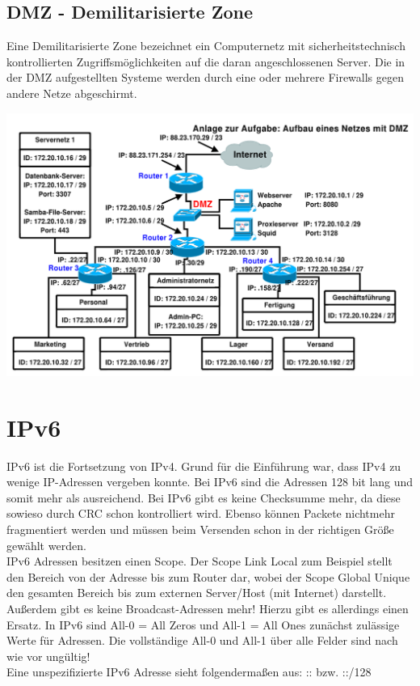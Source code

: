 \documentclass[12pt,a4paper]{article}
\begin{document}
		\subsection{DMZ - Demilitarisierte Zone}
			Eine Demilitarisierte Zone bezeichnet ein Computernetz mit sicherheitstechnisch kontrollierten Zugriffsmöglichkeiten auf die daran angeschlossenen Server. Die in der DMZ aufgestellten Systeme werden durch eine oder mehrere Firewalls gegen andere Netze abgeschirmt.
			\begin{center}
				\includegraphics[scale=0.9]{Bilder/DMZ.PNG}
			\end{center}
	
	\section{IPv6}
		IPv6 ist die Fortsetzung von IPv4. Grund für die Einführung war, dass IPv4 zu wenige IP-Adressen vergeben konnte. Bei IPv6 sind die Adressen 128 bit lang und somit mehr als ausreichend. Bei IPv6 gibt es keine Checksumme mehr, da diese sowieso durch CRC schon kontrolliert wird. Ebenso können Packete nichtmehr fragmentiert werden und müssen beim Versenden schon in der richtigen Größe gewählt werden. \\
		IPv6 Adressen besitzen einen Scope. Der Scope Link Local zum Beispiel stellt den Bereich von der Adresse bis zum Router dar, wobei der Scope Global Unique den gesamten Bereich bis zum externen Server/Host (mit Internet) darstellt. Außerdem gibt es keine Broadcast-Adressen mehr! Hierzu gibt es allerdings einen Ersatz. In IPv6 sind All-0 = All Zeros und All-1 = All Ones zunächst zulässige Werte für Adressen. Die vollständige All-0 und All-1 über alle Felder sind nach wie vor ungültig! \\
		Eine unspezifizierte IPv6 Adresse sieht folgendermaßen aus:\newline
		:: bzw. ::/128
\end{document}
